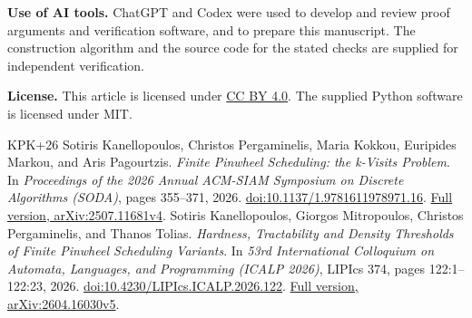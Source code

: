 \documentclass[11pt,a4paper]{article}
\begin{document}
\textbf{Use of AI tools.} ChatGPT and Codex were used to develop and review proof arguments and verification software, and to prepare this manuscript. The construction algorithm and the source code for the stated checks are supplied for independent verification.

\textbf{License.} This article is licensed under \href{https://creativecommons.org/licenses/by/4.0/}{CC BY 4.0}. The supplied Python software is licensed under MIT.
\begin{thebibliography}{KPK+26}
Sotiris Kanellopoulos, Christos Pergaminelis, Maria Kokkou, Euripides Markou, and Aris Pagourtzis. \emph{Finite Pinwheel Scheduling: the k-Visits Problem}. In \emph{Proceedings of the 2026 Annual ACM-SIAM Symposium on Discrete Algorithms (SODA)}, pages 355--371, 2026. \href{https://doi.org/10.1137/1.9781611978971.16}{doi:10.1137/1.9781611978971.16}. \href{https://arxiv.org/abs/2507.11681v4}{Full version, arXiv:2507.11681v4}.
Sotiris Kanellopoulos, Giorgos Mitropoulos, Christos Pergaminelis, and Thanos Tolias. \emph{Hardness, Tractability and Density Thresholds of Finite Pinwheel Scheduling Variants}. In \emph{53rd International Colloquium on Automata, Languages, and Programming (ICALP 2026)}, LIPIcs 374, pages 122:1--122:23, 2026. \href{https://doi.org/10.4230/LIPIcs.ICALP.2026.122}{doi:10.4230/LIPIcs.ICALP.2026.122}. \href{https://arxiv.org/abs/2604.16030v5}{Full version, arXiv:2604.16030v5}.
\end{thebibliography}
\end{document}
